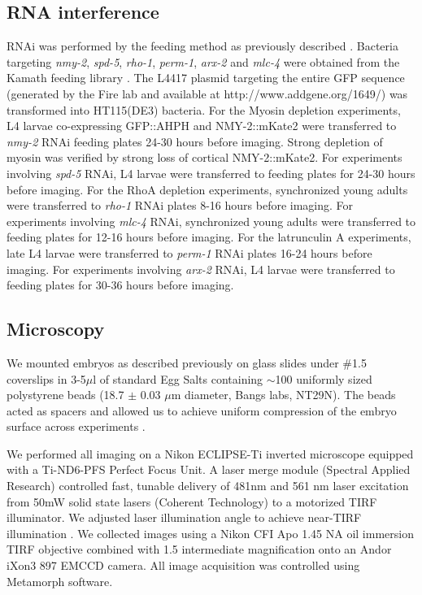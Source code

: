 \subsection{RNA interference}
RNAi was performed by the feeding method as previously described  \cite{Timmons:2001wg}.  Bacteria targeting \textit{nmy-2}, \textit{spd-5}, \textit{rho-1}, \textit{perm-1}, \textit{arx-2} and \textit{mlc-4} were obtained from the Kamath feeding library  \cite{Kamath:2003bk}. The L4417 plasmid targeting the entire GFP sequence (generated by the Fire lab and available at http://www.addgene.org/1649/) was transformed into HT115(DE3) bacteria. For the Myosin depletion experiments, L4 larvae co-expressing GFP::AHPH and NMY-2::mKate2  were transferred to \textit{nmy-2} RNAi feeding plates 24-30 hours before imaging. Strong depletion of myosin was verified by strong loss of cortical NMY-2::mKate2. For experiments involving \textit{spd-5} RNAi, L4 larvae were transferred to feeding plates for 24-30 hours before imaging. For the RhoA depletion experiments, synchronized young adults were transferred to \textit{rho-1} RNAi plates 8-16 hours before imaging. For experiments involving \textit{mlc-4} RNAi, synchronized young adults were transferred to feeding plates for 12-16 hours before imaging. For the latrunculin A experiments, late L4 larvae were transferred to \textit{perm-1} RNAi plates 16-24 hours before imaging. For experiments involving \textit{arx-2} RNAi, L4 larvae were transferred to feeding plates for 30-36 hours before imaging.


\subsection{Microscopy}
We mounted embryos as described previously  \cite{Robin:2014jf} on glass slides under \#1.5 coverslips in 3-5$\mu$l of standard Egg Salts containing $\sim$100 uniformly sized polystyrene beads (18.7 $\pm$ 0.03 $\mu$m diameter, Bangs labs, NT29N).  The beads acted as spacers and allowed us to achieve uniform compression of the embryo surface across experiments  \cite{Robin:2014jf}.

We performed all imaging on a Nikon ECLIPSE-Ti inverted microscope equipped with a Ti-ND6-PFS Perfect Focus Unit. A laser merge module (Spectral Applied Research) controlled fast, tunable delivery of  481nm and 561 nm laser excitation from 50mW solid state lasers (Coherent Technology) to a motorized TIRF illuminator. We adjusted laser illumination angle to achieve near-TIRF illumination  \cite{Tokunaga:2008kc}. We collected images using a Nikon CFI Apo 1.45 NA oil immersion TIRF objective combined with 1.5 intermediate magnification onto an Andor iXon3 897 EMCCD camera. All image acquisition was controlled using Metamorph software.



